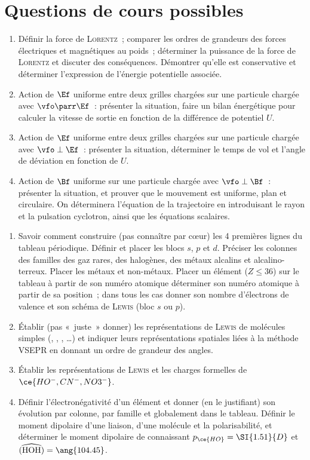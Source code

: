 \documentclass[a4paper, 12pt, final, garamond]{book}
\begin{document}
\section{Questions de cours possibles}
\begin{enumerate}
	\item Définir la force de \textsc{Lorentz}~; comparer les ordres de
	      grandeurs des forces électriques et magnétiques au poids~; déterminer la
	      puissance de la force de \textsc{Lorentz} et discuter des conséquences.
	      Démontrer qu'elle est conservative et déterminer l'expression de
	      l'énergie potentielle associée.
	\item Action de $\Ef$ uniforme entre deux grilles chargées sur une particule
	      chargée avec $\vfo\parr\Ef$~: présenter la situation, faire un bilan
	      énergétique pour calculer la vitesse de sortie en fonction de la
	      différence de potentiel $U$.
	\item Action de $\Ef$ uniforme entre deux grilles chargées sur une particule
	      chargée avec $\vfo\perp\Ef$~: présenter la situation, déterminer le
	      temps de vol et l'angle de déviation en fonction de $U$.
	\item Action de $\Bf$ uniforme sur une particule chargée avec
	      $\vfo\perp\Bf$~: présenter la situation, et prouver que le mouvement est
	      uniforme, plan et circulaire. On déterminera l'équation de la
	      trajectoire en introduisant le rayon et la pulsation cyclotron, ainsi
	      que les équations scalaires.
\end{enumerate}
\begin{enumerate}[resume]
	\item Savoir comment construire (pas connaître par cœur) les 4 premières
	      lignes du tableau périodique. Définir et placer les blocs $s$, $p$ et
	      $d$. Préciser les colonnes des familles des gaz rares, des halogènes,
	      des métaux alcalins et alcalino-terreux. Placer les métaux et
	      non-métaux. Placer un élément ($Z \leq 36$) sur le tableau à partir de
	      son numéro atomique \textbf{} déterminer son numéro atomique
	      à partir de sa position~; dans tous les cas donner son nombre
	      d'électrons de valence et son schéma de \textsc{Lewis} (bloc $s$ ou
	      $p$).
	\item Établir (pas «~juste~» donner) les représentations de \textsc{Lewis}
	      de molécules simples (, , , …) et
	      indiquer leurs représentations spatiales liées à la méthode VSEPR en
	      donnant un ordre de grandeur des angles.
	\item Établir les représentations de \textsc{Lewis} et les charges formelles
	      de $\ce{HO^-, CN^-, NO3^-}$.
	\item Définir l'électronégativité d'un élément et donner (en le justifiant)
	      son évolution par colonne, par famille et globalement dans le tableau.
	      Définir le moment dipolaire d'une liaison, d'une molécule et la
	      polarisabilité, et déterminer le moment dipolaire de 
	      connaissant $p_{\ce{HO}} = \SI{1.51}{D}$ et $\widehat{({\rm HOH})} =
		      \ang{104.45}$.
\end{enumerate}
\end{document}
